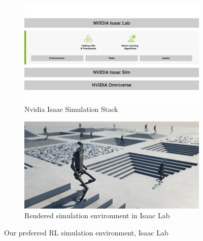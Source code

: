 \documentclass{article}
\begin{document}
\begin{figure}[htbp]
\centering
\begin{subfigure}{0.48\columnwidth}
  \includegraphics[width=\linewidth]{figures/isaac_lab_stack.jpg}
  \caption*{Nvidia Isaac Simulation Stack}
\end{subfigure}
\hfill
\begin{subfigure}{0.48\columnwidth}
  \includegraphics[width=\linewidth]{figures/isaac_lab.jpg}
  \caption*{Rendered simulation environment in Isaac Lab}
\end{subfigure}
\caption{Our preferred RL simulation environment, Isaac Lab}
\label{fig:isaac-sim}
\end{figure}
\end{document}
